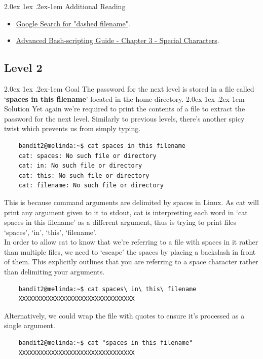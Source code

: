 \documentclass[11pt]{article}
\makeatletter
\renewcommand{\paragraph}{%
  \@startsection{paragraph}{4}%
  {\z@}{2.0ex \@plus 1ex \@minus .2ex}{-1em}%
  {\normalfont\normalsize\bfseries}%
}
\makeatother
\begin{document}
\paragraph{Additional Reading}
\begin{itemize}
\itemsep0em
\item \href{https://www.google.com/search?q=dashed+filename}{Google Search for "dashed filename"}.
\item \href{http://tldp.org/LDP/abs/html/special-chars.html}{Advanced Bash-scripting Guide - Chapter 3 - Special Characters}.
\end{itemize}
\newpage

\subsection{Level 2}
\paragraph{Goal}
The password for the next level is stored in a file called `\textbf{spaces in this filename}' located in the home directory.
\paragraph{Solution}
Yet again we're required to print the contents of a file to extract the password for the next level.
Similarly to previous levels, there's another spicy twist which prevents us from simply typing.
\begin{lstlisting}
	bandit2@melinda:~$ cat spaces in this filename    
	cat: spaces: No such file or directory
	cat: in: No such file or directory
	cat: this: No such file or directory
	cat: filename: No such file or directory
\end{lstlisting}
This is because command arguments are delimited by spaces in Linux. As cat will print any argument given to it to stdout, cat is interpretting each word in `cat spaces in this filename' as a different argument, thus is trying to print files `spaces', `in', `this', `filename'.\\

In order to allow cat to know that we're referring to a file with spaces in it rather than multiple files, we need to `escape' the spaces by placing
a backslash in front of them. This explicitly outlines that you are referring to a space character rather than delimiting your arguments.
\begin{lstlisting}
	bandit2@melinda:~$ cat spaces\ in\ this\ filename
	XXXXXXXXXXXXXXXXXXXXXXXXXXXXXXXX
\end{lstlisting}
Alternatively, we could wrap the file with quotes to ensure it's processed as a single argument.
\begin{lstlisting}
	bandit2@melinda:~$ cat "spaces in this filename" 
	XXXXXXXXXXXXXXXXXXXXXXXXXXXXXXXX
\end{lstlisting}
\end{document}
